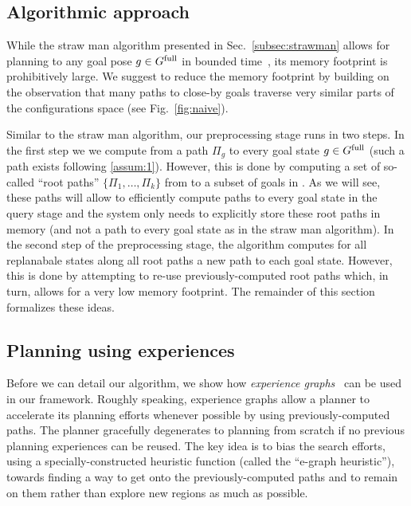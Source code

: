 \documentclass[conference]{IEEEtran}
\begin{document}
\subsection{Algorithmic approach}
While the straw man algorithm presented in Sec.~\ref{subsec:strawman} allows for planning to any goal pose $ g \in G^{\textrm{full}}$ in bounded time~\Tbound, its memory footprint is prohibitively large.
%
We suggest to reduce the memory footprint by building on the observation that many paths to close-by goals traverse very similar parts of the configurations space (see Fig.~\ref{fig:naive}).

Similar to the straw man algorithm, our preprocessing stage runs in two steps.
In the first step we we compute from \Shome a path $\Pi_g$ to every goal state $ g \in G^{\textrm{full}}$ (such a path exists following \ref{assum:1}). However, this is done by computing a set of so-called ``root paths'' $\{\Pi_1, \ldots, \Pi_k \}$ from \Shome to a subset of goals in \Gfull. 
As we will see, these paths will allow to efficiently compute paths to every goal state in the query stage and the system only needs to explicitly store these root paths in memory (and not a path to every goal state as in the straw man algorithm).
%
In the second step of the preprocessing stage, the algorithm computes for all replanabale states along all root paths a new path to each goal state. However, this is done by attempting to re-use previously-computed root paths which, in turn, allows for a very low memory footprint.
%
The remainder of this section formalizes these ideas.


\subsection{Planning using experiences}
\label{subsec:experience}
Before we can detail our algorithm, we show how \emph{experience graphs}~\cite{PCCL12} can be used in our framework.
%
Roughly speaking, experience graphs allow a planner  to accelerate its planning efforts whenever possible by using previously-computed paths. The planner gracefully degenerates to planning from scratch if no previous planning experiences can be reused.
%
The key idea is to bias the search efforts, using a specially-constructed heuristic function (called the ``e-graph heuristic''), towards finding a way to get onto the previously-computed paths and to remain on them rather than explore new regions as much as possible. 
\end{document}
